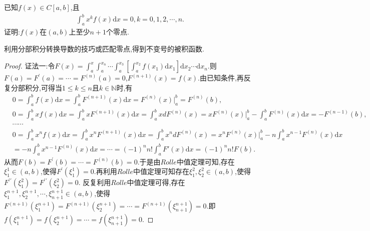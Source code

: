 \documentclass[../../main.tex]{subfiles}%
\begin{document}
\begin{proposition}\label{proposition:x^kf积分为0则f至少有n+1个零点}
已知$f(x)\in C[a,b]$,且
\begin{align*}
\int_a^b{x^kf\left( x \right) \mathrm{d}x}=0, k=0,1,2,\cdots ,n .
\end{align*}
证明:$f(x)$在$(a,b)$上至少$n+1$个零点.
\end{proposition}
\begin{note}
利用分部积分转换导数的技巧或匹配零点,得到不变号的被积函数.
\end{note}
\begin{proof}

{\color{blue}证法一:}令\(F(x)=\int_a^x\int_a^{x_n}\cdots\int_a^{x_3}\left[\int_a^{x_2}f(x_1)\mathrm{d}x_1\right]\mathrm{d}x_2\cdots \mathrm{d}x_n\).则\(F(a)=F^\prime(a)=\cdots=F^{(n)}(a)=0\),\(F^{(n + 1)}(x)=f(x)\).由已知条件,再反复分部积分,可得当\(1\leqslant k\leqslant n\)且\(k\in\mathbb{N}\)时,有
\begin{align*}
&0=\int_a^b{f\left( x \right) \mathrm{d}x}=\int_a^b{F^{\left( n+1 \right)}\left( x \right) \mathrm{d}x}=F^{\left( n \right)}\left( x \right) \Big|_{a}^{b}=F^{\left( n \right)}\left( b \right) ,
\\
&0=\int_a^b{xf\left( x \right) \mathrm{d}x}=\int_a^b{xF^{\left( n+1 \right)}\left( x \right) \mathrm{d}x}=\int_a^b{xdF^{\left( n \right)}\left( x \right)}=xF^{\left( n \right)}\left( x \right) \Big| _{a}^{b}-\int_a^b{F^{\left( n \right)}\left( x \right) \mathrm{d}x}=-F^{\left( n-1 \right)}\left( b \right) ,
\\
&\cdots \cdots 
\\
&0=\int_a^b{x^nf\left( x \right) \mathrm{d}x}=\int_a^b{x^nF^{\left( n+1 \right)}\left( x \right) \mathrm{d}x}=\int_a^b{x^ndF^{\left( n \right)}\left( x \right)}=x^nF^{\left( n \right)}\left( x \right) \Big| _{a}^{b}-n\int_a^b{x^{n-1}F^{\left( n \right)}\left( x \right) \mathrm{d}x}
\\
&=-n\int_a^b{x^{n-1}F^{\left( n \right)}\left( x \right) \mathrm{d}x}=\cdots =\left( -1 \right) ^nn!\int_a^b{F'\left( x \right) \mathrm{d}x}=\left( -1 \right) ^nn!F\left( b \right) .
\end{align*}
从而\(F(b)=F^\prime(b)=\cdots=F^{(n)}(b)=0\).于是由\(Rolle\)中值定理可知,存在\(\xi_1^1\in(a,b)\),使得\(F^\prime(\xi_1^1)=0\).再利用\(Rolle\)中值定理可知存在\(\xi_1^2,\xi_2^2\in(a,b)\),使得\(F^{\prime\prime}(\xi_1^2)=F^{\prime\prime}(\xi_2^2)=0\).
反复利用\(Rolle\)中值定理可得,存在\(\xi_1^{n + 1},\xi_2^{n + 1},\cdots,\xi_{n + 1}^{n + 1}\in(a,b)\),使得\(F^{(n + 1)}(\xi_1^{n + 1})=F^{(n + 1)}(\xi_2^{n + 1})=\cdots=F^{(n + 1)}(\xi_{n + 1}^{n + 1})=0\).即\(f(\xi_1^{n + 1})=f(\xi_2^{n + 1})=\cdots=f(\xi_{n + 1}^{n + 1})=0\).


\end{proof}
\end{document}
